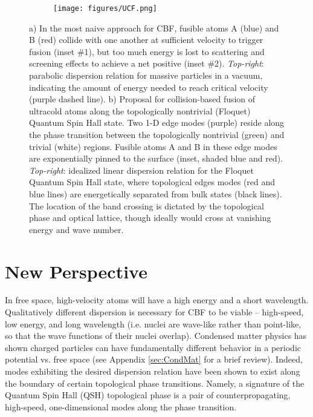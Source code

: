 \documentclass[onecolumn,
               superscriptaddress,
               floatfix,
               longbibliography, 
               showkeys,apl]{revtex4-2}
\begin{document}
\begin{figure}[H]
\begin{subfigure}{.5\textwidth}
    \centering
    \caption{}    
    \label{subfig:CBF}
\end{subfigure}
\begin{subfigure}{.5\textwidth}
    \centering
    \texttt{[image: figures/UCF.png]}
    \caption{}
    \label{subfig:UCF}
\end{subfigure}
\caption{a) In the most naive approach for CBF, fusible atoms A (blue) and B (red) collide with one another at sufficient velocity to trigger fusion (inset \#1), but too much energy is lost to scattering and screening effects to achieve a net positive (inset \#2). \textit{Top-right}: parabolic dispersion relation for massive particles in a vacuum, indicating the amount of energy needed to reach critical velocity (purple dashed line). b) Proposal for collision-based fusion of ultracold atoms along the topologically nontrivial (Floquet) Quantum Spin Hall state. Two 1-D edge modes (purple) reside along the phase transition between the topologically nontrivial (green) and trivial (white) regions. Fusible atoms A and B in these edge modes are exponentially pinned to the surface (inset, shaded blue and red). \textit{Top-right}: idealized linear dispersion relation for the Floquet Quantum Spin Hall state, where topological edges modes (red and blue lines) are energetically separated from bulk states (black lines). The location of the band crossing is dictated by the topological phase and optical lattice, though ideally would cross at vanishing energy and wave number.}
\end{figure}


\section{New Perspective}

In free space, high-velocity atoms will have a high energy and a short wavelength. Qualitatively different dispersion is necessary for CBF to be viable -- high-speed, low energy, and long wavelength (i.e. nuclei are wave-like rather than point-like, so that the wave functions of their nuclei overlap). Condensed matter physics has shown charged particles can have fundamentally different behavior in a periodic potential vs. free space (see Appendix \ref{sec:CondMat} for a brief review). 
Indeed, modes exhibiting the desired dispersion relation have been shown to exist along the boundary of certain topological phase transitions. Namely, a signature of the Quantum Spin Hall (QSH) topological phase is a pair of counterpropagating, high-speed, one-dimensional modes along the phase transition.
\end{document}
